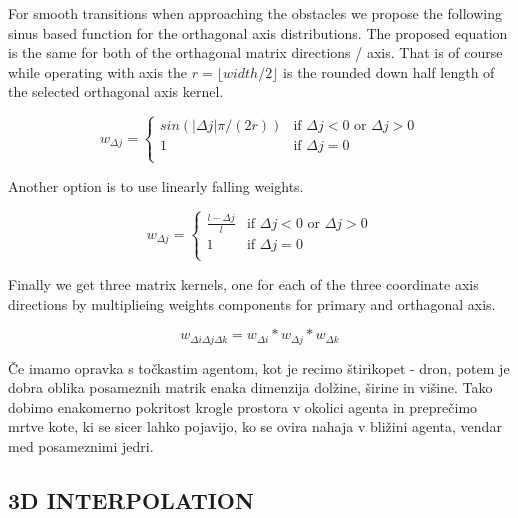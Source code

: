 \documentclass[letterpaper, 10 pt, conference]{ieeeconf}  %
\begin{document}
For smooth transitions when approaching the obstacles we propose the following sinus based function for the orthagonal axis distributions. The proposed equation is the same for both of the orthagonal matrix directions / axis. That is of course while operating with axis the $r=\lfloor width / 2 \rfloor$ is the rounded down half length of the selected orthagonal axis kernel.

\begin{equation}
	w_{\Delta j} =
	\begin{cases} 
		sin(\left| \Delta j \right| \pi / (2 r)) & \text{if } \Delta j < 0 \text{~or }  \Delta j > 0 \\
		1 & \text{if } \Delta j = 0 \\
	\end{cases}
\end{equation}

Another option is to use linearly falling weights.

\begin{equation}
	w_{\Delta j} =
	\begin{cases} 
		\frac{l - \Delta j }{l} & \text{if } \Delta j < 0 \text{~or }  \Delta j > 0 \\
		1 & \text{if } \Delta j = 0 \\
	\end{cases}
\end{equation}


Finally we get three matrix kernels, one for each of the three coordinate axis directions by multiplieing weights components for primary and orthagonal axis.

\begin{equation}
	w_{\Delta i \Delta j \Delta k} = w_{\Delta i} * w_{\Delta j} * w_{\Delta k}
\end{equation}

Če imamo opravka s točkastim agentom, kot je recimo štirikopet - dron, potem je dobra oblika posameznih matrik enaka dimenzija dolžine, širine in višine. Tako dobimo enakomerno pokritost krogle prostora v okolici agenta in preprečimo mrtve kote, ki se sicer lahko pojavijo, ko se ovira nahaja v bližini agenta, vendar med posameznimi jedri. 


\subsection{3D INTERPOLATION} 
\end{document}
